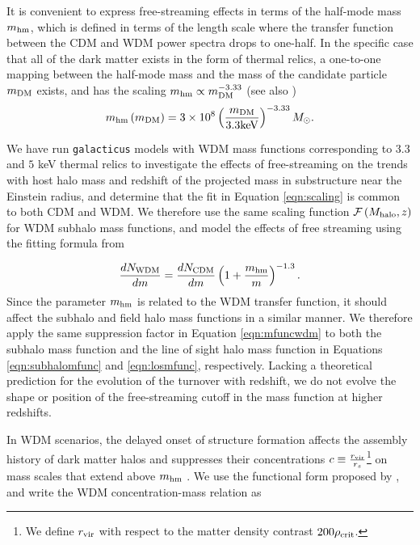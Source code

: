 It is convenient to express free-streaming effects in terms of the half-mode mass ${m_{\rm{hm}}}$, which is defined in terms of the length scale where the transfer function between the CDM and WDM power spectra drops to one-half. In the specific case that all of the dark matter exists in the form of thermal relics, a one-to-one mapping between the half-mode mass and the mass of the  candidate particle $m_{\rm{DM}}$ exists, and has the scaling ${m_{\rm{hm}}} \propto m_{\rm{DM}}^{-3.33}$ \cite{Schneider++12} (see also \cite{BlandfordNarayan86})
\begin{equation}
\label{eqn:masskev}
m_{\rm{hm}}\left(m_{\rm{DM}}\right) = 3\times 10^{8} \left(\frac{m_{\rm{DM}}}{\rm{3.3keV}}\right)^{-3.33} {M_{\odot}}.
\end{equation}

We have run {\tt{galacticus}} models \cite{Benson++13} with WDM mass functions corresponding to $3.3$ and $5$ keV thermal relics to investigate the effects of free-streaming on the trends with host halo mass and redshift of the projected mass in substructure near the Einstein radius, and determine that the fit in Equation \ref{eqn:scaling} is common to both CDM and WDM. We therefore use the same scaling function $\mathcal{F} \left(M_{\rm{halo}}, z\right)$ for WDM subhalo mass functions, and model the effects of free streaming using the fitting formula from \cite{Lovell++14}

\begin{equation}
\label{eqn:mfuncwdm}
\frac{dN_{\rm{WDM}}}{dm} = \frac{dN_{\rm{CDM}}}{dm} \left(1+\frac{m_{\rm{hm}}}{m} \right)^{-1.3}.
\end{equation}
Since the parameter ${m_{\rm{hm}}}$ is related to the WDM transfer function, it should affect the subhalo and field halo mass functions in a similar manner. We therefore apply the same suppression factor in Equation \ref{eqn:mfuncwdm} to both the subhalo mass function and the line of sight halo mass function in Equations \ref{eqn:subhalomfunc}  and \ref{eqn:losmfunc}, respectively. Lacking a theoretical prediction for the evolution of the turnover with redshift, we do not evolve the shape or position of the free-streaming cutoff in the mass function at higher redshifts. 

In WDM scenarios, the delayed onset of structure formation affects the assembly history of dark matter halos and suppresses their concentrations $c \equiv \frac{r_{\rm{vir}}}{r_s}$\footnote{We define $r_{\rm{vir}}$ with respect to the matter density contrast $200 \rho_{\rm{crit}}$. } on mass scales that extend above ${m_{\rm{hm}}}$ \cite{Schneider++12, Bose++16}. We use the functional form proposed by \cite{Bose++16}, and write the WDM concentration-mass relation as

